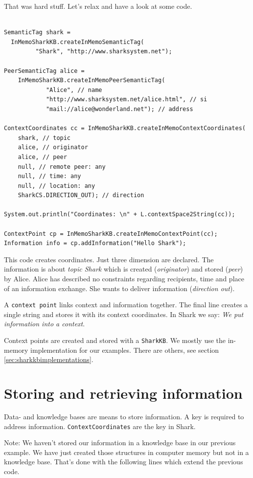 That was hard stuff. Let's relax and have a look at some code. 

\begin{verbatim}

SemanticTag shark = 
  InMemoSharkKB.createInMemoSemanticTag(
         "Shark", "http://www.sharksystem.net");

PeerSemanticTag alice =  
    InMemoSharkKB.createInMemoPeerSemanticTag(
            "Alice", // name
            "http://www.sharksystem.net/alice.html", // si
            "mail://alice@wonderland.net"); // address

ContextCoordinates cc = InMemoSharkKB.createInMemoContextCoordinates(
    shark, // topic
    alice, // originator
    alice, // peer
    null, // remote peer: any
    null, // time: any
    null, // location: any
    SharkCS.DIRECTION_OUT); // direction

System.out.println("Coordinates: \n" + L.contextSpace2String(cc));

ContextPoint cp = InMemoSharkKB.createInMemoContextPoint(cc);
Information info = cp.addInformation("Hello Shark");
\end{verbatim}

This code creates coordinates. Just three dimension are declared. The information is about {\it topic Shark} which is created ({\it originator}) and stored ({\it peer}) by Alice. Alice has described no constraints regarding recipients, time and place of an information exchange. She wants to deliver information ({\it direction out}).

A {\tt context point} links context and information together. The final line creates a single string and stores it with its context coordinates. In Shark we say: {\it We put information into a context}.

Context points are created and stored with a {\tt SharkKB}. We mostly use the in-memory implementation for our examples. There are others, see section \ref{sec:sharkkbimplementations}.

\section{Storing and retrieving information}
Data- and knowledge bases are means to store information. A key is required to address information. {\tt ContextCoordinates} are the key in Shark.

Note: We haven't stored our information in a knowledge base in our previous example. We have just created those structures in computer memory but not in a knowledge base. That's done with the following lines which extend the previous code.

